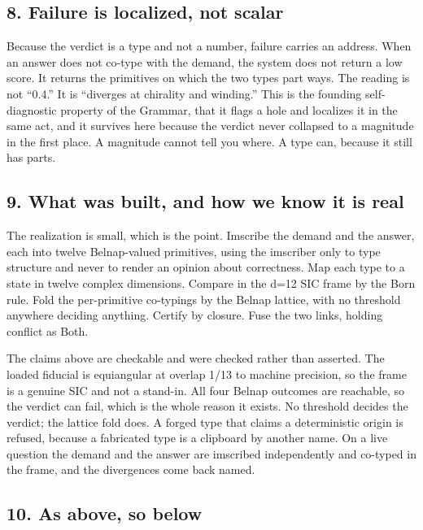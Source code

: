 \documentclass[12pt,a4paper]{article}
\begin{document}
\hypertarget{failure-is-localized-not-scalar}{%
\subsection{8. Failure is localized, not
scalar}\label{failure-is-localized-not-scalar}}

Because the verdict is a type and not a number, failure carries an
address. When an answer does not co-type with the demand, the system
does not return a low score. It returns the primitives on which the two
types part ways. The reading is not ``0.4.'' It is ``diverges at
chirality and winding.'' This is the founding self-diagnostic property
of the Grammar, that it flags a hole and localizes it in the same act,
and it survives here because the verdict never collapsed to a magnitude
in the first place. A magnitude cannot tell you where. A type can,
because it still has parts.

\hypertarget{what-was-built-and-how-we-know-it-is-real}{%
\subsection{9. What was built, and how we know it is
real}\label{what-was-built-and-how-we-know-it-is-real}}

The realization is small, which is the point. Imscribe the demand and
the answer, each into twelve Belnap-valued primitives, using the
imscriber only to type structure and never to render an opinion about
correctness. Map each type to a state in twelve complex dimensions.
Compare in the d=12 SIC frame by the Born rule. Fold the per-primitive
co-typings by the Belnap lattice, with no threshold anywhere deciding
anything. Certify by closure. Fuse the two links, holding conflict as
Both.

The claims above are checkable and were checked rather than asserted.
The loaded fiducial is equiangular at overlap 1/13 to machine precision,
so the frame is a genuine SIC and not a stand-in. All four Belnap
outcomes are reachable, so the verdict can fail, which is the whole
reason it exists. No threshold decides the verdict; the lattice fold
does. A forged type that claims a deterministic origin is refused,
because a fabricated type is a clipboard by another name. On a live
question the demand and the answer are imscribed independently and
co-typed in the frame, and the divergences come back named.

\hypertarget{as-above-so-below}{%
\subsection{10. As above, so below}\label{as-above-so-below}}
\end{document}
